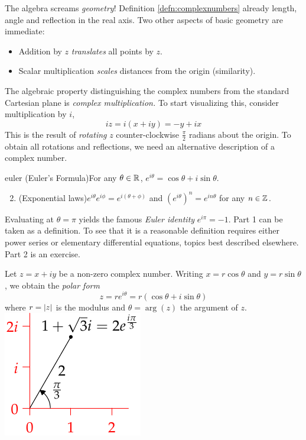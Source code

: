 The algebra screams \emph{geometry}! Definition \ref{defn:complexnumbers} already length, angle and reflection in the real axis. Two other aspects of basic geometry are immediate:
\begin{itemize}%
  \item Addition by $z$ \emph{translates} all points by $z$.
  \item Scalar multiplication \emph{scales} distances from the origin (similarity).
\end{itemize}
The algebraic property distinguishing the complex numbers from the standard Cartesian plane is \emph{complex multiplication.} To start visualizing this, consider multiplication by $i$,
\[
	iz=i(x+iy)=-y+ix
\]
This is the result of \emph{rotating} $z$ counter-clockwise $\frac\pi 2$ radians about the origin. To obtain all rotations and reflections, we need an alternative description of a complex number.

\begin{lemm}{}{euler}
	\exstart (Euler's Formula)\lstsp For any $\theta\in\mathbb{R}$, $e^{i\theta}=\cos\theta+i\sin\theta$. 
	\begin{enumerate}\setcounter{enumi}{1}
	  \item (Exponential laws)\lstsp$e^{i\theta}e^{i\phi}=e^{i(\theta+\phi)}$ and $(e^{i\theta})^n=e^{in\theta}$ for any $n\in\mathbb{Z}$.
	\end{enumerate}
\end{lemm}

Evaluating at $\theta=\pi$ yields the famous \emph{Euler identity} $e^{i\pi}=-1$. Part 1 can be taken as a definition. To see that it is a reasonable definition requires either power series or elementary differential equations, topics best described elsewhere. Part 2 is an exercise.

\goodbreak


\begin{defn}[lower separated=false, sidebyside, sidebyside align=top seam, sidebyside gap=0pt, righthand width=0.34\linewidth]{}{}
	Let $z=x+iy$ be a non-zero complex number.\smallbreak
	Writing $x=r\cos\theta$ and $y=r\sin\theta$, we obtain the \emph{polar form}
	\[
		z=re^{i\theta}=r(\cos\theta+i\sin\theta)
	\]
	where $r=\left| z\right|$ is the modulus and $\theta=\arg(z)$ the argument of $z$.
	\tcblower
	\flushright\includegraphics{complex-polar}
\end{defn}

